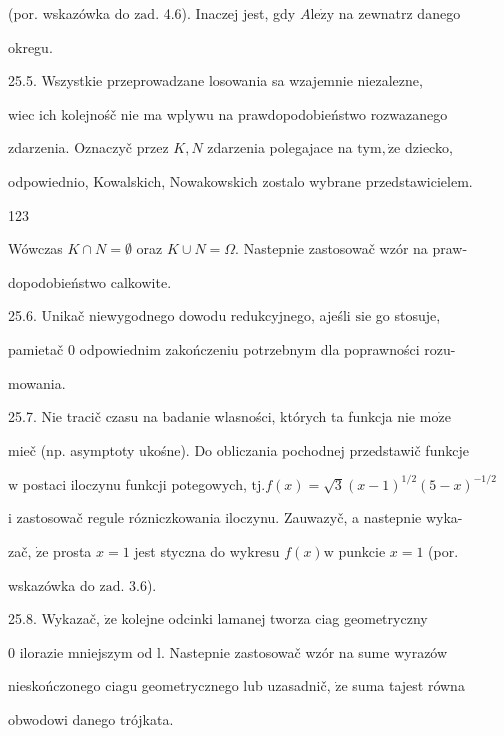 \documentclass[a4paper,12pt]{article}
\begin{document}
(por. wskazówka do $\mathrm{z}\mathrm{a}\mathrm{d}$. 4.6). Inaczej jest, gdy $A\mathrm{l}\mathrm{e}\dot{\mathrm{z}}\mathrm{y}$ na zewnatrz danego

okregu.

25.5. Wszystkie przeprowadzane losowania sa wzajemnie niezalezne,

wiec ich kolejnośč nie ma wplywu na prawdopodobieństwo rozwazanego

zdarzenia. Oznaczyč przez $K, N$ zdarzenia polegajace na $\mathrm{t}\mathrm{y}\mathrm{m}, \dot{\mathrm{z}}\mathrm{e}$ dziecko,

odpowiednio, Kowalskich, Nowakowskich zostalo wybrane przedstawicielem.





123

Wówczas $ K\cap N=\emptyset$ oraz $ K\cup N=\Omega$. Nastepnie zastosowač wzór na praw-

dopodobieństwo calkowite.

25.6. Unikač niewygodnego dowodu redukcyjnego, ajeśli $\mathrm{s}\mathrm{i}\mathrm{e}$ go stosuje,

pamietač $0$ odpowiednim zakończeniu potrzebnym dla poprawności rozu-

mowania.

25.7. Nie tracič czasu na badanie wlasności, których ta funkcja nie $\mathrm{m}\mathrm{o}\dot{\mathrm{z}}\mathrm{e}$

mieč (np. asymptoty ukośne). Do obliczania pochodnej przedstawič funkcje

$\mathrm{w}$ postaci iloczynu funkcji potegowych, $\mathrm{t}\mathrm{j}. f(x)=\sqrt{3}(x-1)^{1/2}(5-x)^{-1/2}$

$\mathrm{i}$ zastosowač regule rózniczkowania iloczynu. Zauwazyč, a nastepnie wyka-

zač, $\dot{\mathrm{z}}\mathrm{e}$ prosta $x= 1$ jest styczna do wykresu $f(x) \mathrm{w}$ punkcie $x= 1$ (por.

wskazówka do $\mathrm{z}\mathrm{a}\mathrm{d}$. 3.6).

25.8. Wykazač, $\dot{\mathrm{z}}\mathrm{e}$ kolejne odcinki lamanej tworza ciag geometryczny

$0$ ilorazie mniejszym od l. Nastepnie zastosowač wzór na sume wyrazów

nieskończonego ciagu geometrycznego lub uzasadnič, $\dot{\mathrm{z}}\mathrm{e}$ suma tajest równa

obwodowi danego trójkata.
\end{document}
